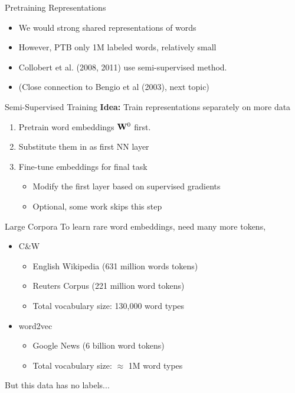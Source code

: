 \documentclass{beamer}
\begin{document}
\begin{frame}{Pretraining Representations}
  \begin{itemize}
  \item We would strong shared representations of words
    \air

  \item However, PTB only 1M labeled words, relatively small

    \air
  \item Collobert et al. (2008, 2011) use semi-supervised method.

    \air
  \item (Close connection to Bengio et al (2003), next topic)
  \end{itemize}
\end{frame}

\begin{frame}{Semi-Supervised Training }
  \textbf{Idea:} Train representations separately on more data

  \begin{enumerate}
  \item Pretrain word embeddings $\mathbf{W}^0$ first.
  \item Substitute them in as first NN layer
  \item Fine-tune embeddings for final task
    \begin{itemize}
    \item Modify the first layer based on supervised gradients
    \item Optional, some work skips this step
    \end{itemize}
  \end{enumerate}
\end{frame}

\begin{frame}{Large Corpora}
  To learn rare word embeddings, need many more tokens,

  \begin{itemize}
    \item C\&W
      \begin{itemize}
      \item English Wikipedia (631 million words tokens)
        \air
      \item Reuters Corpus (221 million word tokens)
        \air
      \item Total vocabulary size: 130,000 word types
      \end{itemize}
    \item word2vec
      \begin{itemize}
      \item Google News (6 billion word tokens)
        \air

      \item Total vocabulary size: $\approx$ 1M word types
      \end{itemize}
    \end{itemize}
  But this data has no labels...
\end{frame}
\end{document}
